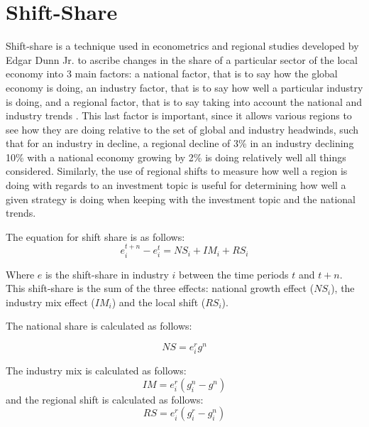 \section{Shift-Share}

Shift-share is a technique used in econometrics and regional studies developed by Edgar Dunn Jr. to ascribe changes in the share of a particular sector of the local economy into 3 main factors: a national factor, that is to say how the global economy is doing, an industry factor, that is to say how well a particular industry is doing, and a regional factor, that is to say taking into account the national and industry trends \citep{dunn1960statistical}.   This last factor is important, since it allows various regions to see how they are doing relative to the set of global and industry headwinds, such that for an industry in decline, a regional decline of 3\% in an industry declining 10\% with a national economy growing by 2\% is doing relatively well all things considered.  Similarly, the use of regional shifts to measure how well a region is doing with regards to an investment topic is useful for determining how well a given strategy is doing when keeping with the investment topic and the national trends. 

The equation for shift share is as follows:
\begin{equation}
   e^{t+n}_{i} - e^{t}_{i} = NS_{i} + IM_{i} + RS_{i}
    \label{Eq:Shft_share}
\end{equation}

Where $e$ is the shift-share in industry $i$ between the time periods $t$ and $t+n$.  This shift-share is the sum of the three effects: national growth effect ($NS_{i}$), the industry mix effect ($IM_{i}$) and the local shift ($RS_{i}$). 

The national share is calculated as follows:

\begin{equation}
    NS = e^{r}_{i}g^{n}
    \label{Eq:NationalShare}
\end{equation}

The industry mix is calculated as follows:
\begin{equation}
    IM = e^{r}_{i}(g^{n}_{i} - g^{n})
    \label{Eq:IndustryMix}
\end{equation}
and the regional shift is calculated as follows: 
\begin{equation}
    RS =  e^{r}_{i}(g^{r}_{i} - g^{n}_{i})
    \label{Eq:RegionalShare}
\end{equation}

